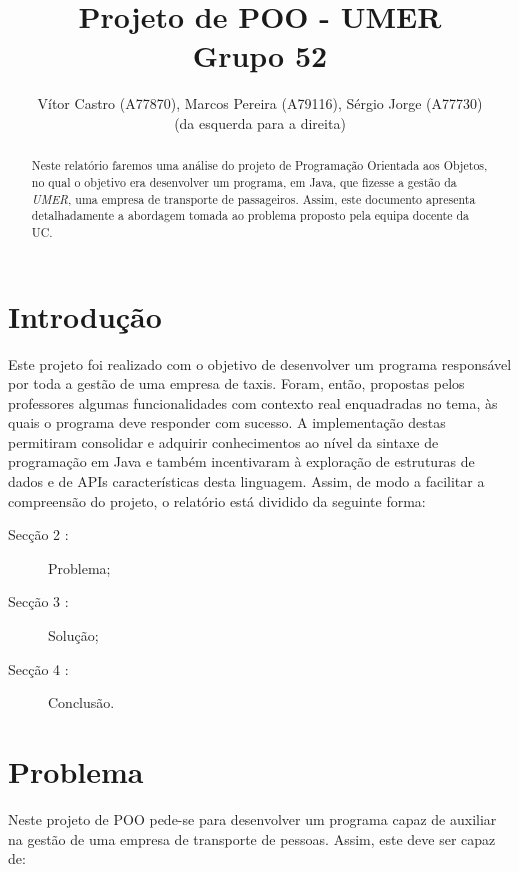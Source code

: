 \documentclass[a4paper]{article}
\title{Projeto de POO - UMER\\Grupo 52}
\author{Vítor Castro (A77870), Marcos Pereira (A79116), Sérgio Jorge (A77730)\\{\tiny(da esquerda para a direita)}}
\date{}
\begin{document}
\maketitle

\begin{abstract}
Neste relatório faremos uma análise do projeto de Programação Orientada aos Objetos, no qual o objetivo era desenvolver um programa, em Java, que fizesse a gestão da \textit{UMER},  uma empresa de transporte de passageiros. Assim, este documento apresenta detalhadamente a abordagem tomada ao problema proposto pela equipa docente da UC.
\end{abstract}

\tableofcontents

\section{Introdução}
\label{sec:intro}

Este projeto foi realizado com o objetivo de desenvolver um programa responsável por toda a gestão de uma empresa de taxis. Foram, então, propostas pelos professores algumas funcionalidades com contexto real enquadradas no tema, às quais o programa deve responder com sucesso. A implementação destas permitiram consolidar e adquirir conhecimentos ao nível da sintaxe de programação em Java e também incentivaram à exploração de estruturas de dados e de APIs características desta linguagem.
Assim, de modo a facilitar a compreensão do projeto, o relatório está dividido da seguinte forma:

\begin{description}
    \item[Secção 2 :] Problema;
    \item[Secção 3 :] Solução;
    \item[Secção 4 :] Conclusão.
\end{description}

\section{Problema}
\label{sec:problema}
Neste projeto de POO pede-se para desenvolver um programa capaz de auxiliar na gestão de uma empresa de transporte de pessoas. Assim, este deve ser capaz de:
\end{document}
